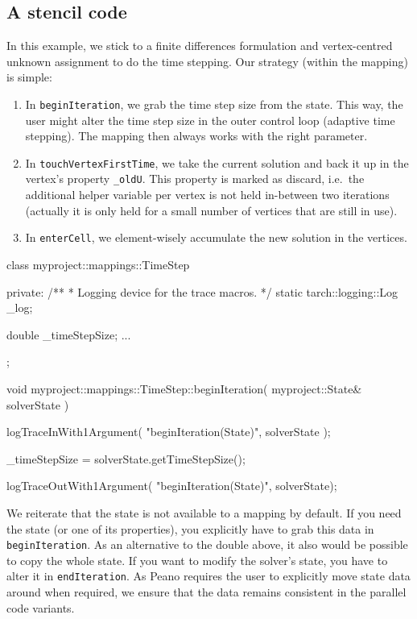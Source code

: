 \subsection{A stencil code}

In this example, we stick to a finite differences formulation and
vertex-centred unknown assignment to do the time stepping.
Our strategy (within the mapping) is simple:
\begin{enumerate}
  \item In \texttt{beginIteration}, we grab the time step size from the state.
  This way, the user might alter the time step size in the outer control loop
  (adaptive time stepping).
  The mapping then always works with the right parameter.
  \item In \texttt{touchVertexFirstTime}, we take the current solution and back
  it up in the vertex's property \texttt{\_oldU}. This property is marked as
  discard, i.e.~the additional helper variable per vertex is not held in-between
  two iterations (actually it is only held for a small number of vertices that
  are still in use). 
  \item In \texttt{enterCell}, we element-wisely accumulate the new solution in
  the vertices.
\end{enumerate}

\begin{code}
class myproject::mappings::TimeStep {
 private:
  /**
   * Logging device for the trace macros.
   */
  static tarch::logging::Log  _log;
    
  double _timeStepSize;
  ...
};


void myproject::mappings::TimeStep::beginIteration(
  myproject::State&  solverState
) {
  logTraceInWith1Argument( "beginIteration(State)", solverState );

  _timeStepSize = solverState.getTimeStepSize();

  logTraceOutWith1Argument( "beginIteration(State)", solverState);
}
\end{code}

\noindent
We reiterate that the state is not available to a mapping by default. If you
need the state (or one of its properties), you explicitly have to grab this data
in \texttt{beginIteration}. As an alternative to the double above, it also would
be possible to copy the whole state. If you want to modify the solver's state,
you have to alter it in \texttt{endIteration}. As Peano requires the user to
explicitly move state data around when required, we ensure that the data remains
consistent in the parallel code variants.

